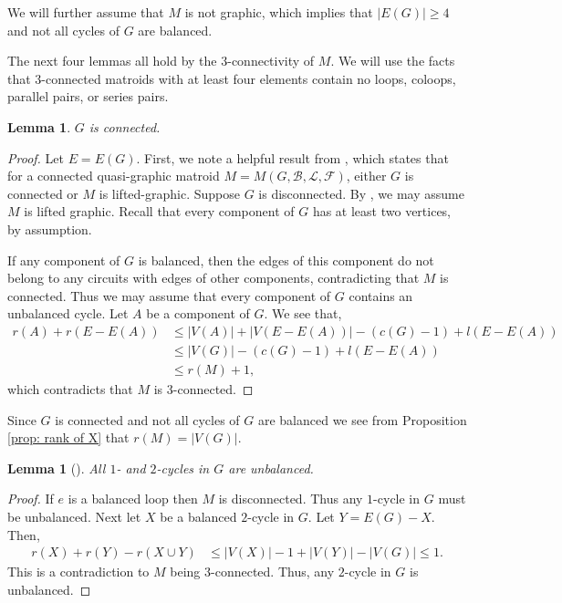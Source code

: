 \documentclass[12pt]{article}
\newtheorem{lemma}[theorem]{Lemma}
\theoremstyle{definition}
\theoremstyle{plain} %
\newcommand{\cB}{\mathcal{B}}
\newcommand{\cF}{\mathcal{F}}
\newcommand{\cL}{\mathcal{L}}
\begin{document}
We will further assume that $M$ is not graphic, which implies that $|E(G)| \ge 4$ and not all cycles of $G$ are balanced.


The next four lemmas all hold by the $3$-connectivity of $M$.
We will use the facts that $3$-connected matroids with at least four elements contain no loops, coloops, parallel pairs, or series pairs.

\begin{lemma}
    $G$ is connected.
\end{lemma}
\begin{proof}
    Let $E = E(G)$.
    First, we note a helpful result from \cite[Corollary 4.7]{Bowler-Funk-Slilaty20}, which states that for a connected quasi-graphic matroid $M=M(G,\cB,\cL,\cF)$, either $G$ is connected or $M$ is lifted-graphic. Suppose $G$ is disconnected. By \cite[Corollary 4.7]{Bowler-Funk-Slilaty20}, we may assume $M$ is lifted graphic. 
    Recall that every component of $G$ has at least two vertices, by assumption. 
    
    If any component of $G$ is balanced, then the edges of this component do not belong to any circuits with edges of other components, contradicting that $M$ is connected. Thus we may assume that every component of $G$ contains an unbalanced cycle. 
    Let $A$ be a component of $G$.
    We see that,
    \begin{align*}
        r(A)+r(E-E(A))&\leq\lvert V(A)\rvert+\lvert V(E-E(A))\rvert-(c(G)-1)+l(E-E(A))\\
        &\leq\lvert V(G)\rvert-(c(G)-1)+l(E-E(A))\\
        &\leq r(M)+1,
    \end{align*}
    which contradicts that $M$ is 3-connected. 
\end{proof}


Since $G$ is connected and not all cycles of $G$ are balanced we see from Proposition \ref{prop: rank of X} that $r(M) = |V(G)|$.

\begin{lemma}[{\cite[Lemma 3.1]{Fife-Mayhew-Oxley-Semple2020}}]\label{lem: small cycles are unbalanced}
All $1$- and $2$-cycles in $G$ are unbalanced.
\end{lemma}
\begin{proof}
If $e$ is a balanced loop then $M$ is disconnected. Thus any $1$-cycle in $G$ must be unbalanced. Next let $X$ be a balanced $2$-cycle in $G$. Let $Y=E(G)-X$. Then,
\begin{align*}
    r(X)+r(Y)-r(X \cup Y) &\leq \lvert V(X)\rvert-1+\lvert V(Y)\rvert-\lvert V(G)\rvert \leq 1.
\end{align*}
This is a contradiction to $M$ being $3$-connected. Thus, any $2$-cycle in $G$ is unbalanced.
\end{proof}
\end{document}
